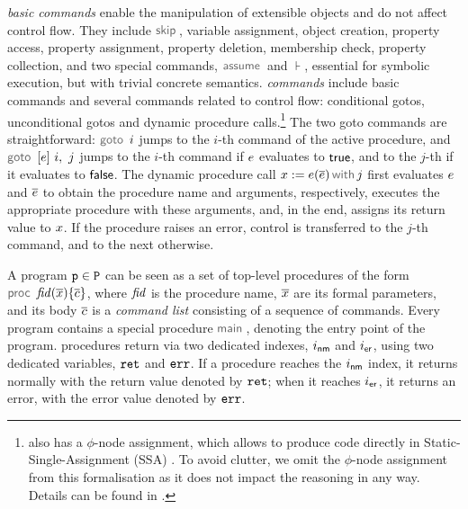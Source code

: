 \jsil \emph{basic commands} enable the manipulation of extensible objects and do not affect control flow. 
They include $\jsilskip$, variable assignment, object creation, property access, property assignment, property deletion, membership check, property collection, and two special commands, $\assume$ and $\assert$, essential for symbolic execution, but with trivial concrete semantics.
%
\jsil \emph{commands} include \jsil basic commands and several commands related to control flow: conditional gotos, unconditional gotos and dynamic procedure calls.\footnote{\jsil also has a $\phi$-node assignment, which allows \JSComp to produce code directly in Static-Single-Assignment (SSA) \cite{SSA}. To avoid clutter, we omit the $\phi$-node assignment from this formalisation as it does not impact the reasoning in any way. Details can be found in \cite{javert}.} 
The two goto commands are straightforward: $\goto \ i$ jumps to the $i$-th command of the active procedure, and $\ifgoto{\jsilexpr}{i}{j}$ jumps to the $i$-th command if $e$ evaluates to ${\sf true}$, and to the $j$-th if it evaluates to ${\sf false}$. 
The dynamic procedure call $\jsilcall{\jvar}{\jsilexpr}{\jvec{\jsilexpr}}{j}$ first evaluates  $e$ and $\overline{e}$ to obtain the procedure name and arguments, respectively, executes the appropriate procedure with these arguments, and, in the end, assigns its return value to $x$.
If the procedure raises an error, control is transferred to the $j$-th command, and to the next otherwise. 

A \jsil program $\mathtt{p} \in \mathtt{P}$ can be seen as a set of top-level procedures of the form $\procedure{\fid}{\jvec{\jvar}}{\jvec{\jcmd}}$, where $\mathit{fid}$ is the procedure name, $\overline{x}$ are its formal parameters, and its body ${\overline{c}}$  is a \emph{command list} consisting of a sequence of \jsil commands.
Every \jsil program contains a special procedure $\jsilmain$\hspace{-2pt}, denoting the entry point of the program. 
\jsil procedures return via two dedicated indexes, $i_{{\sf nm}}$ and $i_{{\sf er}}$, using two dedicated variables, $\mathtt{ret}$ and $\mathtt{err}$. If a procedure reaches the $i_{{\sf nm}}$ index, it returns normally with the return value denoted by $\mathtt{ret}$; when it reaches $i_{{\sf er}}$, it returns an error, with the error value denoted by $\mathtt{err}$.

